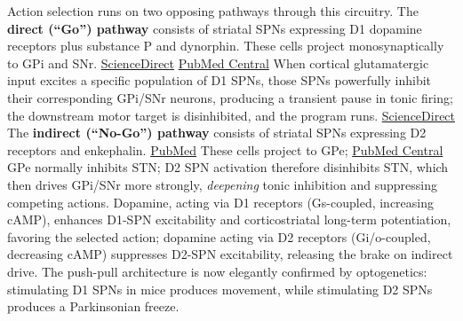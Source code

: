 Action selection runs on two opposing pathways through this circuitry. The \textbf{direct (``Go'') pathway} consists of striatal SPNs expressing D1 dopamine receptors plus substance P and dynorphin. These cells project monosynaptically to GPi and SNr. \href{https://www.sciencedirect.com/science/article/pii/S0960982216306807}{ScienceDirect} \href{https://pmc.ncbi.nlm.nih.gov/articles/PMC8710883/}{PubMed Central} When cortical glutamatergic input excites a specific population of D1 SPNs, those SPNs powerfully inhibit their corresponding GPi/SNr neurons, producing a transient pause in tonic firing; the downstream motor target is disinhibited, and the program runs. \href{https://www.sciencedirect.com/science/article/pii/S0960982214012998}{ScienceDirect} The \textbf{indirect (``No-Go'') pathway} consists of striatal SPNs expressing D2 receptors and enkephalin. \href{https://pubmed.ncbi.nlm.nih.gov/23318875/}{PubMed} These cells project to GPe; \href{https://pmc.ncbi.nlm.nih.gov/articles/PMC8710883/}{PubMed Central} GPe normally inhibits STN; D2 SPN activation therefore disinhibits STN, which then drives GPi/SNr more strongly, \emph{deepening} tonic inhibition and suppressing competing actions. Dopamine, acting via D1 receptors (Gs-coupled, increasing cAMP), enhances D1-SPN excitability and corticostriatal long-term potentiation, favoring the selected action; dopamine acting via D2 receptors (Gi/o-coupled, decreasing cAMP) suppresses D2-SPN excitability, releasing the brake on indirect drive. The push-pull architecture is now elegantly confirmed by optogenetics: stimulating D1 SPNs in mice produces movement, while stimulating D2 SPNs produces a Parkinsonian freeze.

